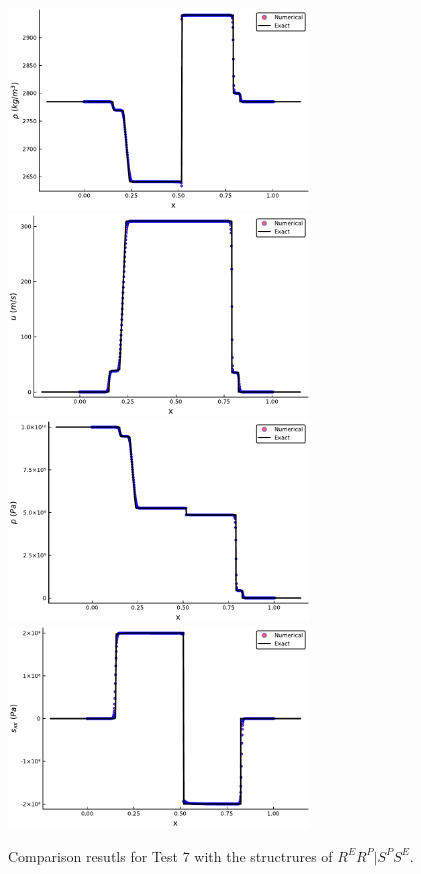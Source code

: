 \documentclass{article}
\numberwithin{equation}{section}
\numberwithin{table}{section}
\begin{document}
\begin{figure}
  \centering

  \includegraphics[width= 8cm] {case9rho.pdf}
  \includegraphics[width= 8cm] {case9u.pdf}
  \includegraphics[width= 8cm] {case9p.pdf}
  \includegraphics[width= 8cm] {case9sxx.pdf}

    \caption{Comparison resutls for Test 7 with the structrures of $R^ER^P|S^PS^E$.  }
  \label{fig:case9}
\end{figure}
\end{document}
